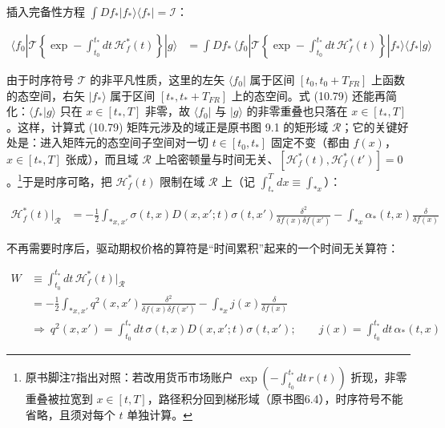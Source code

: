 插入完备性方程 $\int Df_*|f_*\rangle\langle f_*|=\mathcal{I}$：

\begin{equation*}
\begin{aligned}
\langle f_0|\mathcal{T}\left\{\exp-\int_{t_0}^{t_*}dt\,\mathcal{H}_f^*(t)\right\}|g\rangle
&=\int Df_*\,\langle f_0|\mathcal{T}\left\{\exp-\int_{t_0}^{t_*}dt\,\mathcal{H}_f^*(t)\right\}|f_*\rangle\langle f_*|g\rangle
\end{aligned}
\tag{10.79}
\end{equation*}

由于时序符号 $\mathcal{T}$ 的非平凡性质，这里的左矢 $\langle f_0|$ 属于区间 $[t_0,t_0+T_{FR}]$ 上函数的态空间，右矢 $|f_*\rangle$ 属于区间 $[t_*,t_*+T_{FR}]$ 上的态空间。式 (10.79) 还能再简化：$\langle f_*|g\rangle$ 只在 $x\in[t_*,T]$ 非零，故 $\langle f_0|$ 与 $|g\rangle$ 的非零重叠也只落在 $x\in[t_*,T]$。这样，计算式 (10.79) 矩阵元涉及的域正是原书图 9.1 的矩形域 $\mathcal{R}$；它的关键好处是：进入矩阵元的态空间子空间对一切 $t\in[t_0,t_*]$ 固定不变（都由 $f(x)$，$x\in[t_*,T]$ 张成），而且域 $\mathcal{R}$ 上哈密顿量与时间无关、$[\mathcal{H}_f^*(t),\mathcal{H}_f^*(t')]=0$。\footnote{原书脚注7指出对照：若改用货币市场账户 $\exp(-\int_{t_0}^{t_*}dt\,r(t))$ 折现，非零重叠被拉宽到 $x\in[t,T]$，路径积分回到梯形域（原书图6.4），时序符号不能省略，且须对每个 $t$ 单独计算。}于是时序可略，把 $\mathcal{H}_f^*(t)$ 限制在域 $\mathcal{R}$ 上（记 $\int_{t_*}^Tdx\equiv\int_{*x}$）：

\begin{equation*}
\begin{aligned}
\mathcal{H}_f^*(t)\big|_{\mathcal{R}}&=-\frac{1}{2}\int_{*x,x'}\sigma(t,x)D(x,x';t)\sigma(t,x')\frac{\delta^2}{\delta f(x)\delta f(x')}-\int_{*x}\alpha_*(t,x)\frac{\delta}{\delta f(x)}
\end{aligned}
\end{equation*}

不再需要时序后，驱动期权价格的算符是“时间累积”起来的一个时间无关算符：

\begin{equation*}
\begin{aligned}
W&\equiv\int_{t_0}^{t_*}dt\,\mathcal{H}_f^*(t)\big|_{\mathcal{R}}\\
&=-\frac{1}{2}\int_{*x,x'}q^2(x,x')\frac{\delta^2}{\delta f(x)\delta f(x')}-\int_{*x}j(x)\frac{\delta}{\delta f(x)}\\
&\Rightarrow\ q^2(x,x')=\int_{t_0}^{t_*}dt\,\sigma(t,x)D(x,x';t)\sigma(t,x');\qquad j(x)=\int_{t_0}^{t_*}dt\,\alpha_*(t,x)
\end{aligned}
\tag{10.80}
\end{equation*}

